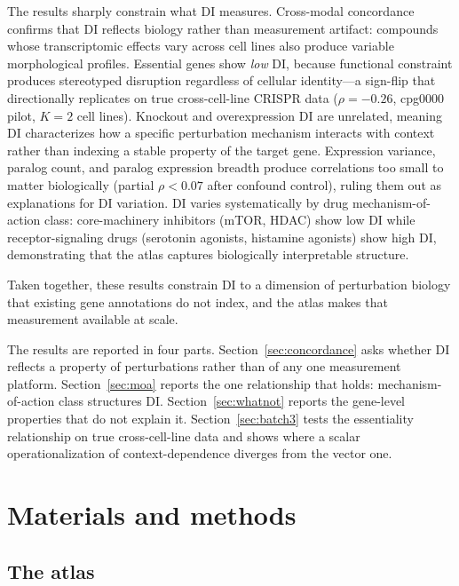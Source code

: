 \documentclass[11pt]{article}
\begin{document}
The results sharply constrain what DI measures.  Cross-modal concordance confirms
that DI reflects biology rather than measurement artifact: compounds
whose transcriptomic effects vary across cell lines also produce
variable morphological profiles.  Essential genes show \emph{low} DI, because functional
constraint produces stereotyped disruption regardless of cellular
identity---a sign-flip that directionally replicates on true
cross-cell-line CRISPR data ($\rho = -0.26$, cpg0000 pilot, $K = 2$
cell lines).  Knockout and overexpression DI are unrelated, meaning DI
characterizes how a specific perturbation mechanism interacts with
context rather than indexing a stable property of the target gene.
Expression variance, paralog count, and paralog expression breadth
produce correlations too small to matter biologically (partial
$\rho < 0.07$ after confound control), ruling them out as explanations
for DI variation.  DI varies systematically by drug mechanism-of-action
class: core-machinery inhibitors (mTOR, HDAC) show low DI while
receptor-signaling drugs (serotonin agonists, histamine agonists)
show high DI, demonstrating that the atlas captures biologically
interpretable structure.

Taken together, these results constrain DI to a dimension of
perturbation biology that existing gene annotations do not index, and
the atlas makes that measurement available at scale.

The results are reported in four parts.  Section~\ref{sec:concordance} asks
whether DI reflects a property of perturbations rather than of any one
measurement platform.  Section~\ref{sec:moa} reports the one relationship that
holds: mechanism-of-action class structures DI.  Section~\ref{sec:whatnot}
reports the gene-level properties that do not explain it.
Section~\ref{sec:batch3} tests the essentiality relationship on true
cross-cell-line data and shows where a scalar operationalization of
context-dependence diverges from the vector one.


\section*{Materials and methods}\label{sec:methods}
\subsection*{The atlas}
\label{sec:atlas}
\end{document}
